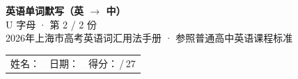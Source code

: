 \documentclass[10pt,a4paper]{article}
\begin{document}
\pagestyle{plain}

\begin{center}
{\LARGE\bfseries 英语单词默写（英 $\to$ 中）}\\[0.22em]
{\large U 字母 · 第 2 / 2 份}\\[0.18em]
{\small 2026年上海市高考英语词汇用法手册 · 参照普通高中英语课程标准}
\end{center}

\vspace{0.25em}
\noindent\begin{tabular}{@{}p{}@{}p{}@{}p{}@{}}
姓名：\underline{\hspace{2.0cm}} & 日期：\underline{\hspace{2.0cm}} & 得分：\underline{\hspace{1.3cm}}\,/\,27 \\
\end{tabular}

\vspace{0.3em}

\vspace{0.08em}
\end{document}
